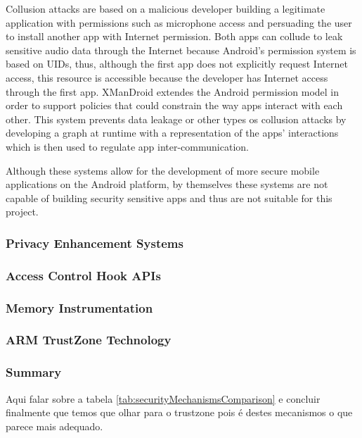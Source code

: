 Collusion attacks are based on a malicious developer building a legitimate application with permissions such as microphone access and persuading the user to install another app with Internet permission. Both apps can collude to leak sensitive audio data through the Internet because Android's permission system is based on UIDs, thus, although the first app does not explicitly request Internet access, this resource is accessible because the developer has Internet access through the first app. XManDroid \cite{bugiel2011xmandroid} extendes the Android permission model in order to support policies that could constrain the way apps interact with each other. This system prevents data leakage or other types os collusion attacks by developing a graph at runtime with a representation of the apps’ interactions which is then used to regulate app inter-communication.

Although these systems allow for the development of more secure mobile applications on the Android platform, by themselves these systems are not capable of building security sensitive apps and thus are not suitable for this project. 

\subsubsection{Privacy Enhancement Systems}
\label{sec:privacyenhancement}

\subsubsection{Access Control Hook APIs}
\label{sec:accesscontrolhooks}

\subsubsection{Memory Instrumentation}

\subsubsection{ARM TrustZone Technology}

\subsubsection{Summary}

Aqui falar sobre a tabela \ref{tab:securityMechanismsComparison} e concluir finalmente que temos que olhar para o trustzone pois é destes mecanismos o que parece mais adequado.

